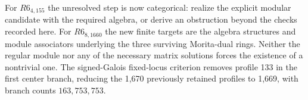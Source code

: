 \documentclass[11pt]{article}
\begin{document}
For $R6_{4,155}$ the unresolved step is now categorical: realize the
explicit modular candidate with the required algebra, or derive an
obstruction beyond the checks recorded here. For $R6_{8,1660}$ the
new finite targets are the algebra structures and module associators
underlying the three surviving Morita-dual rings. Neither the regular
module nor any of the necessary matrix solutions forces the existence
of a nontrivial one. The signed-Galois fixed-locus criterion removes
profile 133 in the first center branch, reducing the 1,670 previously
retained profiles to 1,669, with branch counts $163,753,753$.
\end{document}
